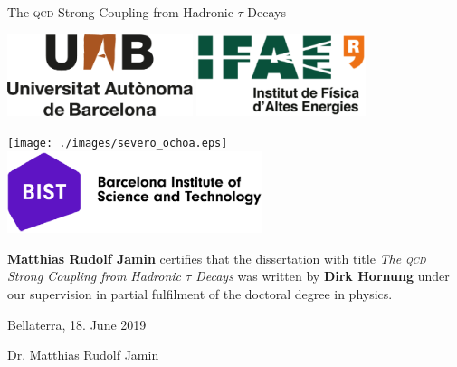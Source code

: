 \documentclass[12pt,a4paper,openright]{scrreprt}
\makeatletter
\numberwithin{equation}{section}       %
\let\org@subfile
\renewcommand*{}[1]{%
  \filename@parse{#1}%
  \expandafter
  \graphicspath\expandafter{\expandafter{\filename@area}}%
  \org@subfile{#1}%
}
\makeatother
\begin{document}
\begin{center}
  \Large The \textsc{qcd} Strong Coupling from Hadronic \(\tau\) Decays

  \makebox[\linewidth]{\rule{\textwidth}{1pt}}

  \vspace{2cm}

  \includegraphics[height=2.4cm]{./images/logo_UAB.eps} \hfill
  \includegraphics[height=2.4cm]{./images/logo_IFAE.eps}

  \vspace{1cm}

  \texttt{[image: ./images/severo\_ochoa.eps]} \hfill
  \includegraphics[height=2.4cm]{./images/bist.eps}

  \vspace{3cm}
\end{center}

\begin{large}
  \textbf{Matthias Rudolf Jamin} certifies that the dissertation with title
  \textit{The \textsc{qcd} Strong Coupling from Hadronic \(\tau\) Decays} was
  written by \textbf{Dirk Hornung} under our supervision in partial fulfilment
  of the doctoral degree in physics.

  \vfill Bellaterra, 18. June 2019 \par
  \vspace{4cm} Dr. Matthias Rudolf Jamin \vspace{1cm}
\end{large}


  



\setcounter{tocdepth}{1}
\tableofcontents

\newpage
{}





\appendix

\printnomenclature
\printbibliography[heading=bibintoc]
\end{document}
